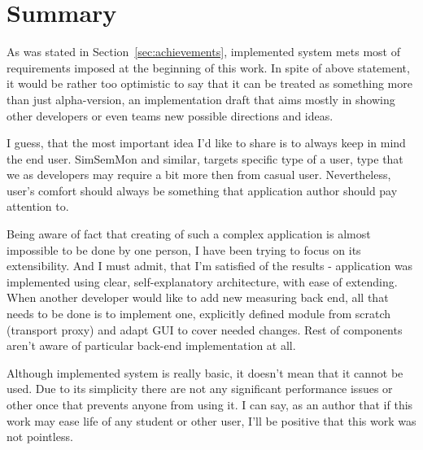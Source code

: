%


\section{Summary}
\label{sec:summary}
 
As was stated in Section~\ref{sec:achievements}, implemented system mets most of requirements imposed at the beginning of this work. In spite of above statement, it would be rather too optimistic to say that it can be treated as something more than just alpha-version, an implementation draft that aims mostly in showing other developers or even teams new possible directions and ideas.

I guess, that the most important idea I\rq{}d like to share is to always keep in mind the end user. SimSemMon and similar, targets specific type of a user, type that we as developers may require a bit more then from casual user. Nevertheless, user\rq{}s comfort should always be something that application author should pay attention to.

Being aware of fact that creating of such a complex application is almost impossible to be done by one person, I have been trying to focus on its extensibility. And I must admit, that I\rq{}m satisfied of the results - application was implemented using clear, self-explanatory architecture, with ease of extending. When another developer would like to add new measuring back end, all that needs to be done is to implement one, explicitly defined  module from scratch (transport proxy) and adapt GUI to cover needed changes. Rest of components aren\rq{}t aware of particular back-end implementation at all.

Although implemented system is really basic, it doesn\rq{}t mean that it cannot be used. Due to its simplicity there are not any significant performance issues or other once that prevents anyone from using it. I can say, as an author that if this work may ease life of any student or other user, I\rq{}ll be positive that this work was not pointless. 
 